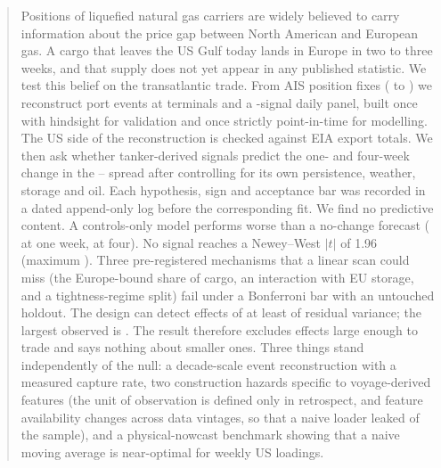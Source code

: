 \begin{abstract}
\noindent
Positions of liquefied natural gas carriers are widely believed to carry
information about the price gap between North American and European gas. A cargo
that leaves the US Gulf today lands in Europe in two to three weeks, and that
supply does not yet appear in any published statistic. We test this belief on the
transatlantic trade. From \nFixes{} AIS position fixes (\fixSpanLo{} to
\fixSpanHi{}) we reconstruct \nEvents{} port events at \nTerminals{} terminals and
a \nSignalKeys-signal daily panel, built once with hindsight for validation and
once strictly point-in-time for modelling. The US side of the reconstruction is
checked against EIA export totals. We then ask whether tanker-derived signals
predict the one- and four-week change in the \HH{}--\TTF{} spread after
controlling for its own persistence, weather, storage and oil. Each hypothesis,
sign and acceptance bar was recorded in a dated append-only log before the
corresponding fit. We find no predictive content. A controls-only model performs
worse than a no-change forecast (\bMTwoSkillHOneCov{} at one week,
\bMTwoSkillHFourCov{} at four). No signal reaches a Newey--West $|t|$ of 1.96
(maximum \bMaxTCov). Three pre-registered mechanisms that a linear scan could miss
(the Europe-bound share of cargo, an interaction with EU storage, and a
tightness-regime split) fail under a Bonferroni bar with an untouched holdout. The
design can detect effects of at least \powerFloor{} of residual variance; the
largest observed is \bMaxRsqCov. The result therefore excludes effects large enough
to trade and says nothing about smaller ones. Three things stand independently of
the null: a decade-scale event reconstruction with a measured capture rate, two
construction hazards specific to voyage-derived features (the unit of observation
is defined only in retrospect, and feature availability changes across data
vintages, so that a naive loader leaked \leakFutureShare{} of the sample), and a
physical-nowcast benchmark showing that a naive moving average is near-optimal for
weekly US loadings.
\end{abstract}
